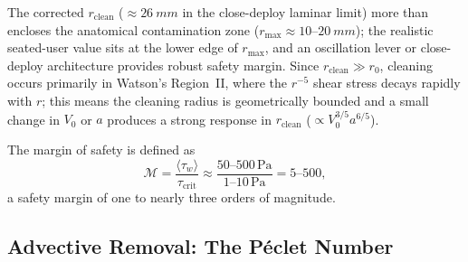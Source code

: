 \documentclass[aps,prfluids,reprint,amsmath,amssymb,floatfix]{revtex4-2}
\begin{document}
The corrected $r_\mathrm{clean}$ ($\approx \SI{26}{mm}$ in the
close-deploy laminar limit) more than encloses the anatomical
contamination zone ($r_\mathrm{max} \approx 10$--$\SI{20}{mm}$); the
realistic seated-user value sits at the lower edge of $r_\mathrm{max}$,
and an oscillation lever or close-deploy architecture provides
robust safety margin. Since $r_\mathrm{clean} \gg r_0$, cleaning
occurs primarily in Watson's Region~II, where the $r^{-5}$ shear stress
decays rapidly with $r$; this means the cleaning radius is geometrically
bounded and a small change in $V_0$ or $a$ produces a strong response in
$r_\mathrm{clean}$ ($\propto V_0^{3/5} a^{6/5}$).

The margin of safety is defined as
\begin{equation}
    \mathcal{M} = \frac{\langle\tau_w\rangle}{\tau_\mathrm{crit}} \approx
    \frac{50\text{--}500\,\mathrm{Pa}}{1\text{--}10\,\mathrm{Pa}} = 5\text{--}500,
    \label{eq:margin}
\end{equation}
a safety margin of one to nearly three orders of magnitude.

\subsection{Advective Removal: The P\'{e}clet Number}
\label{subsec:peclet}
\end{document}
